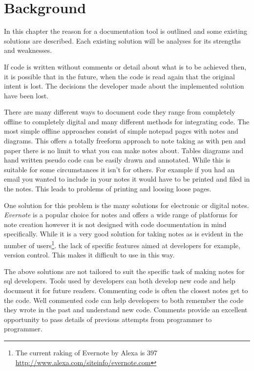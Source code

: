 \chapter{Background}\label{background}

In this chapter the reason for a documentation tool is outlined and some
existing solutions are described. Each existing solution will be analyses for
its strengths and weaknesses.

If code is written without comments or detail about what is to be
achieved then, it is possible that in the future, when the code is read again that the original intent is lost. The decisions the developer made about the implemented solution have been lost.

There are many different ways to document code they range from
completely offline to completely digital and many different methods for
integrating code. The most simple offline approaches consist of simple
notepad pages with notes and diagrams. This offers a totally freeform
approach to note taking as with pen and paper there is no limit to what
you can make notes about. Tables diagrams and hand written pseudo code
can be easily drawn and annotated. While this is suitable for some circumstances it isn't for others. For example if you had an email you wanted to include in your notes it would have to be printed and filed in the notes. This leads to problems of printing and loosing loose pages.

One solution for this problem is the many solutions for electronic or digital
notes. \textit{Evernote}\cite{evernote} is a popular choice for notes and offers
a wide range of platforms for note creation however it is not designed with code
documentation in mind specifically. While it is a very good solution for taking
notes as is evident in the number of users\footnote{The current raking of
Evernote by Alexa is 397
\href{http://www.alexa.com/siteinfo/evernote.com}{http://www.alexa.com/siteinfo/evernote.com}}.
the lack of specific features aimed at developers for example, version control.
This makes it difficult to use in this way.

The above solutions are not tailored to suit the specific task of making notes
for sql developers. Tools used by developers can both develop new code and help
document it for future readers. Commenting code is often the closest notes get
to the code. Well commented code can help developers to both remember the code
they wrote in the past and understand new code. Comments provide an excellent
opportunity to pass details of previous attempts from programmer to programmer.

